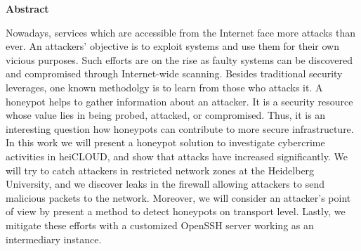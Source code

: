 \thispagestyle{empty}
\begin{center}
    \begin{minipage}[c][0.48\textheight][b]{0.9\textwidth}
        \small
        \begin{center}
            \textbf{Abstract}
        \end{center}\par
        \vspace{\baselineskip}
        Nowadays, services which are accessible from the Internet face more attacks than ever.
        An attackers' objective is to exploit systems and use them for their own vicious purposes.
        Such efforts are on the rise as faulty systems can be discovered and compromised through Internet-wide scanning.
        Besides traditional security leverages, one known methodolgy is to learn from those who attacks it.
        A honeypot helps to gather information about an attacker.
        It is a security resource whose value lies in being probed, attacked, or compromised.
        Thus, it is an interesting question how honeypots can contribute to more secure infrastructure.
        In this work we will present a honeypot solution to investigate cybercrime activities in heiCLOUD, and show that attacks have increased significantly.
        We will try to catch attackers in restricted network zones at the Heidelberg University, and we discover leaks in the firewall allowing attackers to send malicious packets to the network.
        Moreover, we will consider an attacker's point of view by present a method to detect honeypots on transport level.
        Lastly, we mitigate these efforts with a customized OpenSSH server working as an intermediary instance.
    \end{minipage}\par
    \vfill
\end{center}